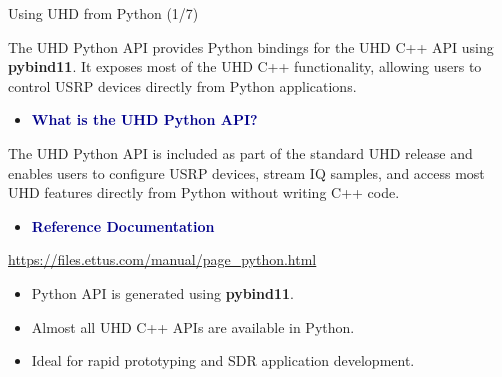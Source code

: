 \begin{frame}[fragile]{Using UHD from Python (1/7)}
\vspace{-1.0cm}
\footnotesize

The UHD Python API provides Python bindings for the UHD C++ API using
\textbf{pybind11}. It exposes most of the UHD C++ functionality, allowing
users to control USRP devices directly from Python applications.

\vspace{0.3cm}

\begin{itemize}
    \item \textbf{\textcolor{DarkBlue}{What is the UHD Python API?}}
\end{itemize}

\hspace{2.8em}
\parbox{0.88\linewidth}{
\footnotesize
The UHD Python API is included as part of the standard UHD release and
enables users to configure USRP devices, stream IQ samples, and access
most UHD features directly from Python without writing C++ code.
}

\vspace{0.3cm}

\begin{itemize}
    \item \textbf{\textcolor{DarkBlue}{Reference Documentation}}
\end{itemize}

\hspace{2.8em}
\scriptsize
\url{https://files.ettus.com/manual/page_python.html}

\vspace{0.35cm}

\begin{itemize}
    \item Python API is generated using \textbf{pybind11}.
    \item Almost all UHD C++ APIs are available in Python.
    \item Ideal for rapid prototyping and SDR application development.
\end{itemize}

\end{frame}